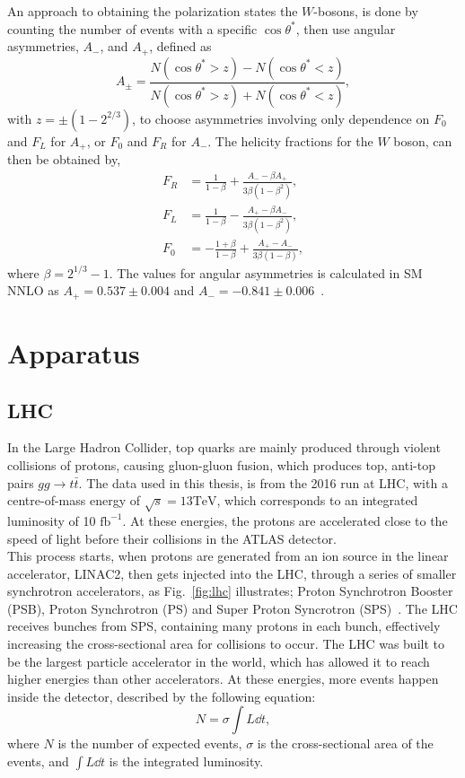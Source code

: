 \documentclass[12pt,a4paper]{article}
\numberwithin{equation}{section}
\begin{document}
An approach to obtaining the polarization states the $W$-bosons, is done by
counting the number of events with a specific $\cos \theta^*$, then use angular
asymmetries, $A_-$, and $A_+$, defined as
\begin{equation}\label{eq:asymmetries}
  A_{\pm}=\frac{N(\cos \theta^* > z)-N(\cos \theta^* < z)}{N(\cos \theta^* > z)+N(\cos \theta^* < z)},
\end{equation}
with $z=\pm(1-2^{2/3})$, to choose asymmetries involving only dependence on
$F_0$ and $F_L$ for $A_+$, or $F_0$ and $F_R$ for $A_-$. The helicity fractions
for the $W$ boson, can then be obtained by,
\begin{align}
  F_R&=\frac{1}{1-\beta}+\frac{A_- - \beta A_+}{3\beta (1-\beta^2)},\\
  F_L&=\frac{1}{1-\beta}-\frac{A_+ - \beta A_-}{3\beta (1-\beta^2)},\\
  F_0&=-\frac{1+\beta}{1-\beta}+\frac{A_+ - A_-}{3\beta (1-\beta)},
\end{align}
where $\beta = 2^{1/3}-1$. The values for angular asymmetries is calculated in SM
NNLO as $A_+=0.537 \pm 0.004$ and
$A_-=-0.841 \pm 0.006$~\cite[24]{CastroNunesFiolhais:1544047}.

\section{Apparatus}
\subsection{LHC}
In the Large Hadron Collider, top quarks are mainly produced through violent
collisions of protons, causing gluon-gluon fusion, which produces top, anti-top
pairs $gg \rightarrow t\bar t$. The data used in this thesis, is from the 2016 run at LHC,
with a centre-of-mass energy of $\sqrt s = 13 \mathrm{TeV}$, which corresponds
to an integrated luminosity of 10 $\mathrm{fb}^{-1}$\cite{oreach2020}. At these
energies, the protons are accelerated close to the speed of light before their
collisions in the ATLAS detector.\\

This process starts, when protons are generated from an ion source in the linear
accelerator, LINAC2, then gets injected into the LHC, through a series of
smaller synchrotron accelerators, as Fig.~\ref{fig:lhc} illustrates; Proton
Synchrotron Booster (PSB), Proton Synchrotron (PS) and Super Proton Syncrotron
(SPS)~\cite[135]{Evans_2008}. The LHC receives bunches from SPS, containing many
protons in each bunch, effectively increasing the cross-sectional area for
collisions to occur. The LHC was built to be the largest particle accelerator in the
world, which has allowed it to reach higher energies than other accelerators. At
these energies, more events happen inside the detector, described by the
following equation:
\begin{equation}
  N = \sigma \int L \dd t,
\end{equation}
where $N$ is the number of expected events, $\sigma$ is the cross-sectional area of
the events, and $\int L \dd t$ is the integrated luminosity.
\end{document}

